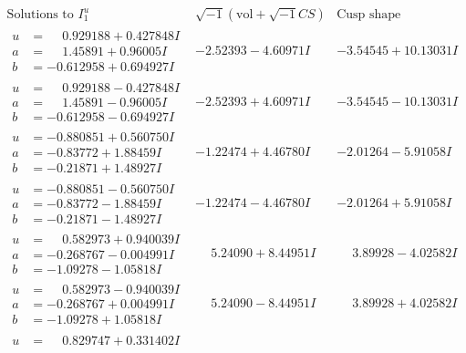 \documentclass[1p]{elsarticle_modified}
\theoremstyle{definition}
\newcommand{\I}{\sqrt{-1}}
\begin{document}
$$\begin{array}{c|c|c}  
\text{Solutions to }I^u_{1}& \I (\text{vol} + \sqrt{-1}CS) & \text{Cusp shape}\\
 \hline 
\begin{aligned}
u &= \phantom{-}0.929188 + 0.427848 I \\
a &= \phantom{-}1.45891 + 0.96005 I \\
b &= -0.612958 + 0.694927 I\end{aligned}
 & -2.52393 - 4.60971 I & -3.54545 + 10.13031 I \\ \hline\begin{aligned}
u &= \phantom{-}0.929188 - 0.427848 I \\
a &= \phantom{-}1.45891 - 0.96005 I \\
b &= -0.612958 - 0.694927 I\end{aligned}
 & -2.52393 + 4.60971 I & -3.54545 - 10.13031 I \\ \hline\begin{aligned}
u &= -0.880851 + 0.560750 I \\
a &= -0.83772 + 1.88459 I \\
b &= -0.21871 + 1.48927 I\end{aligned}
 & -1.22474 + 4.46780 I & -2.01264 - 5.91058 I \\ \hline\begin{aligned}
u &= -0.880851 - 0.560750 I \\
a &= -0.83772 - 1.88459 I \\
b &= -0.21871 - 1.48927 I\end{aligned}
 & -1.22474 - 4.46780 I & -2.01264 + 5.91058 I \\ \hline\begin{aligned}
u &= \phantom{-}0.582973 + 0.940039 I \\
a &= -0.268767 - 0.004991 I \\
b &= -1.09278 - 1.05818 I\end{aligned}
 & \phantom{-}5.24090 + 8.44951 I & \phantom{-}3.89928 - 4.02582 I \\ \hline\begin{aligned}
u &= \phantom{-}0.582973 - 0.940039 I \\
a &= -0.268767 + 0.004991 I \\
b &= -1.09278 + 1.05818 I\end{aligned}
 & \phantom{-}5.24090 - 8.44951 I & \phantom{-}3.89928 + 4.02582 I \\ \hline\begin{aligned}
u &= \phantom{-}0.829747 + 0.331402 I \\

\end{aligned}
\end{array}$$
\end{document}
